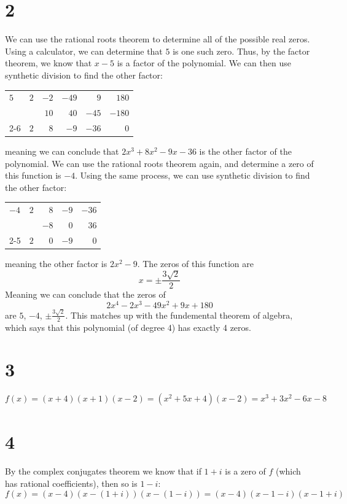 \documentclass{article}
\theoremstyle{definition}
\begin{document}
\section*{2}
We can use the rational roots theorem to determine all of the possible real zeros. Using a calculator, we can determine that $5$ is one such zero.
Thus, by the factor theorem, we know that $x-5$ is a factor of the polynomial. We can then use synthetic division to find the other factor:
\begin{center}
\begin{tabular}{l|rrrrr}
	$5$ & $2$ & $-2$ & $-49$ & $9$ & $180$ \\
	& & $10$ & $40$ & $-45$ & $-180$ \\
	\cmidrule{2-6}
	& $2$ & $8$ & $-9$ & $-36$ & $0$
\end{tabular}
\end{center}
meaning we can conclude that $2x^3+8x^2-9x-36$ is the other factor of the polynomial. We can use the rational roots theorem again, and determine 
a zero of this function is $-4$. Using the same process, we can use synthetic division to find the other factor:
\begin{center}
\begin{tabular}{l|rrrr}
	$-4$ & $2$ & $8$ & $-9$ & $-36$ \\
	& & $-8$ & $0$ & $36$ \\
	\cmidrule{2-5}
	& $2$ & $0$ & $-9$ & $0$
\end{tabular}
\end{center}
meaning the other factor is $2x^2-9$. The zeros of this function are 
\[ x=\pm\frac{3\sqrt{2}}{2} \] Meaning we can conclude that the zeros of 
\[ 2x^4-2x^3-49x^2+9x+180 \] are $5$, $-4$, $\pm\frac{3\sqrt{2}}{2}$. This matches up with the fundemental theorem of algebra, which says that 
this polynomial (of degree 4) has exactly 4 zeros.

\section*{3}
\[ f(x)=(x+4)(x+1)(x-2)=(x^2+5x+4)(x-2)=x^3+3x^2-6x-8 \]

\section*{4}
By the complex conjugates theorem we know that if $1+i$ is a zero of $f$ (which has rational coefficients), then so is $1-i$:
\[ f(x)=(x-4)(x-(1+i))(x-(1-i))=(x-4)(x-1-i)(x-1+i) \]
\end{document}
